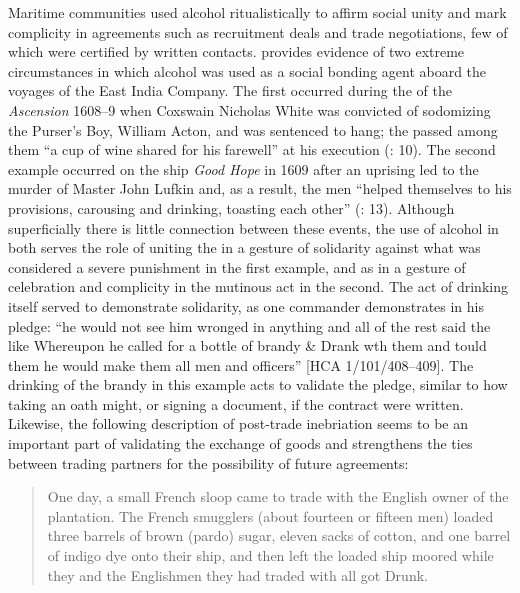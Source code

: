 Maritime communities used alcohol ritualistically to affirm social unity and mark complicity in agreements such as recruitment deals and trade negotiations, few of which were certified by written contacts. \citet{Fury2015} provides evidence of two extreme circumstances in which alcohol was used as a social bonding agent aboard the voyages of the East India Company. The first occurred during the  of the \textit{Ascension} 1608–9 when Coxswain Nicholas White was convicted of sodomizing the Purser’s Boy, William Acton, and was sentenced to hang; the  passed among them “a cup of wine shared for his farewell” at his execution (\citealt{Fury2015}: 10). The second example occurred on the ship \textit{Good Hope} in 1609 after an uprising led to the murder of Master John Lufkin and, as a result, the men “helped themselves to his provisions, carousing and drinking, toasting each other” (\citealt{Fury2015}: 13). Although superficially there is little connection between these events, the use of alcohol in both serves the role of uniting the  in a gesture of solidarity against what was considered a severe punishment in the first example, and as in a gesture of celebration and complicity in the mutinous act in the second. The act of drinking itself served to demonstrate solidarity, as one commander demonstrates in his pledge: “he would not see him wronged in anything and all of the rest said the like Whereupon he called for a bottle of brandy \& Drank wth them and tould them he would make them all men and officers” [HCA 1/101/408–409]. The drinking of the brandy in this example acts to validate the pledge, similar to how taking an oath might, or signing a document, if the contract were written. Likewise, the following description of post-trade inebriation seems to be an important part of validating the exchange of goods and strengthens the ties between trading partners for the possibility of future agreements:

\begin{quotation}
One day, a small French sloop came to trade with the English owner of the plantation.  The French smugglers (about fourteen or fifteen men) loaded three barrels of brown (pardo) sugar, eleven sacks of cotton, and one barrel of indigo dye onto their ship, and then left the loaded ship moored while they and the Englishmen they had traded with all got Drunk. \citep[15]{Hatfield2016} 
\end{quotation}

